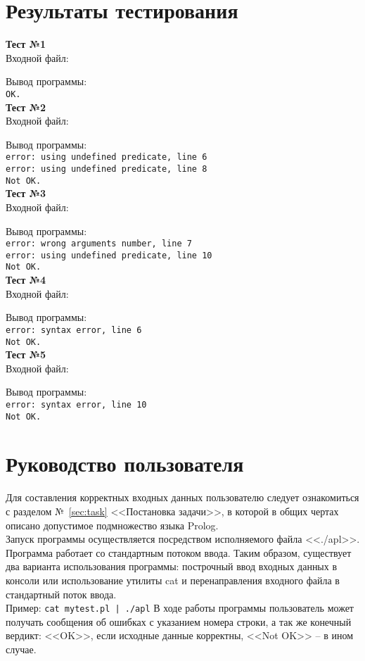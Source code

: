 \documentclass[a4paper,12pt]{article}
\newcommand{\psection}[1]{\newpage\section{#1}}
\begin{document}
    \psection{Результаты тестирования} {
    \lstset{numberstyle=\footnotesize\ttfamily, numbers=left, 
    frame=single, language=Prolog, breaklines=true, showstringspaces=false,basicstyle=\footnotesize\ttfamily}
   
    {\centering \bf Тест №1\\}
    \noindent
    Входной файл:
    
    Вывод программы:\\
    \verb|OK.|\\

    {\centering \bf Тест №2\\}
    \noindent
    Входной файл:
    
    Вывод программы:\\
    \verb|error: using undefined predicate, line 6|\\
    \verb|error: using undefined predicate, line 8|\\
    \verb|Not OK.|\\

    {\centering \bf Тест №3\\}
    \noindent
    Входной файл:
    
    Вывод программы:\\
    \verb|error: wrong arguments number, line 7|\\
    \verb|error: using undefined predicate, line 10|\\
    \verb|Not OK.|\\

    {\centering \bf Тест №4\\}
    \noindent
    Входной файл:
    
    Вывод программы:\\
    \verb|error: syntax error, line 6|\\
    \verb|Not OK.|\\

    {\centering \bf Тест №5\\}
    \noindent
    Входной файл:
    
    Вывод программы:\\
    \verb|error: syntax error, line 10|\\
    \verb|Not OK.|\\

    }

    \psection{Руководство пользователя}
    Для составления корректных входных данных пользователю следует ознакомиться с разделом
    №~\ref{sec:task} <<Постановка задачи>>, в которой в общих чертах описано допустимое подмножество
    языка Prolog.\\
    Запуск программы осуществляется посредством исполняемого файла <<./apl>>. Программа работает со
    стандартным потоком ввода. Таким образом, существует два варианта использования программы:
    построчный ввод входных данных в консоли или использование утилиты cat и перенаправления входного
    файла в стандартный поток ввода.\\
    Пример: \texttt{cat mytest.pl | ./apl}
    В ходе работы программы пользователь может получать сообщения об ошибках с указанием номера строки,
    а так же конечный вердикт: <<OK>>, если исходные данные корректны, <<Not OK>> -- в ином случае.\\
    
\end{document}
